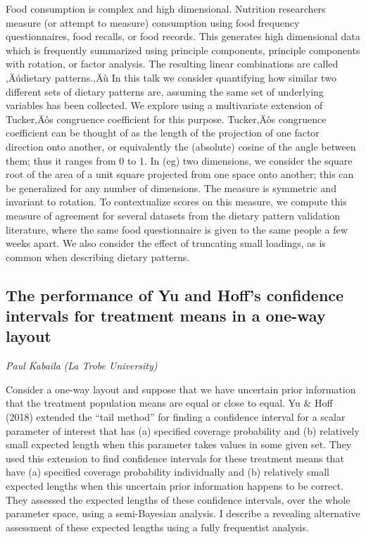 \documentclass[
]{scrreprt}
\begin{document}
Food consumption is complex and high dimensional. Nutrition researchers
measure (or attempt to measure) consumption using food frequency
questionnaires, food recalls, or food records. This generates high
dimensional data which is frequently summarized using principle
components, principle components with rotation, or factor analysis. The
resulting linear combinations are called ‚Äúdietary patterns.‚Äù In this
talk we consider quantifying how similar two different sets of dietary
patterns are, assuming the same set of underlying variables has been
collected. We explore using a multivariate extension of Tucker‚Äôs
congruence coefficient for this purpose. Tucker‚Äôs congruence
coefficient can be thought of as the length of the projection of one
factor direction onto another, or equivalently the (absolute) cosine of
the angle between them; thus it ranges from 0 to 1. In (eg) two
dimensions, we consider the square root of the area of a unit square
projected from one space onto another; this can be generalized for any
number of dimensions. The measure is symmetric and invariant to
rotation. To contextualize scores on this measure, we compute this
measure of agreement for several datasets from the dietary pattern
validation literature, where the same food questionnaire is given to the
same people a few weeks apart. We also consider the effect of truncating
small loadings, as is common when describing dietary patterns.

\subsection{The performance of Yu and Hoff's confidence intervals for
treatment means in a one-way
layout}\label{the-performance-of-yu-and-hoffs-confidence-intervals-for-treatment-means-in-a-one-way-layout}

\emph{Paul Kabaila} \emph{(La Trobe University)}

\setlength{\parskip}{0.5em}

Consider a one-way layout and suppose that we have uncertain prior
information that the treatment population means are equal or close to
equal. Yu \& Hoff (2018) extended the ``tail method'' for finding a
confidence interval for a scalar parameter of interest that has (a)
specified coverage probability and (b) relatively small expected length
when this parameter takes values in some given set. They used this
extension to find confidence intervals for these treatment means that
have (a) specified coverage probability individually and (b) relatively
small expected lengths when this uncertain prior information happens to
be correct. They assessed the expected lengths of these confidence
intervals, over the whole parameter space, using a semi-Bayesian
analysis. I describe a revealing alternative assessment of these
expected lengths using a fully frequentist analysis.
\end{document}
